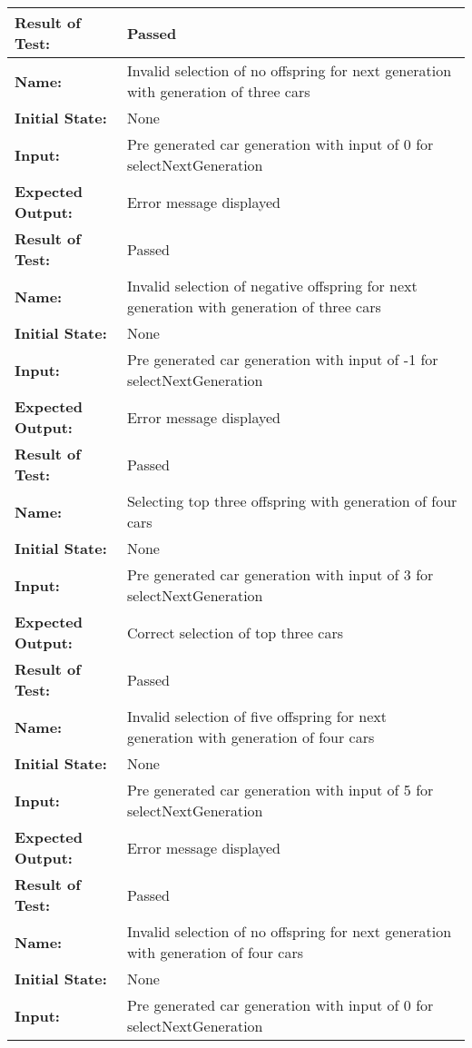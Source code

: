 \documentclass[12pt, titlepage]{article}
\begin{document}
\begin{center}
\begin{longtable}{ l | p{10cm} }
\textbf{Result of Test:} & Passed\\
\hline
\rule{0pt}{1.5em}\textbf{Name:} & Invalid selection of no offspring for next generation with generation of three cars\\
\textbf{Initial State:} & None\\
\textbf{Input:} & Pre generated car generation with input of 0 for selectNextGeneration\\
\textbf{Expected Output:} & Error message displayed\\[0.6em]
\textbf{Result of Test:} & Passed\\
\hline
\rule{0pt}{1.5em}\textbf{Name:} & Invalid selection of negative offspring for next generation with generation of three cars\\
\textbf{Initial State:} & None\\
\textbf{Input:} & Pre generated car generation with input of -1 for selectNextGeneration\\
\textbf{Expected Output:} & Error message displayed\\[0.6em]
\textbf{Result of Test:} & Passed\\
\hline
\rule{0pt}{1.5em}\textbf{Name:} & Selecting top three offspring with generation of four cars\\
\textbf{Initial State:} & None\\
\textbf{Input:} & Pre generated car generation with input of 3 for selectNextGeneration\\
\textbf{Expected Output:} & Correct selection of top three cars\\[0.6em]
\textbf{Result of Test:} & Passed\\
\hline
\rule{0pt}{1.5em}\textbf{Name:} & Invalid selection of five offspring for next generation with generation of four cars\\
\textbf{Initial State:} & None\\
\textbf{Input:} & Pre generated car generation with input of 5 for selectNextGeneration\\
\textbf{Expected Output:} & Error message displayed\\[0.6em]
\textbf{Result of Test:} & Passed\\
\hline
\rule{0pt}{1.5em}\textbf{Name:} & Invalid selection of no offspring for next generation with generation of four cars\\
\textbf{Initial State:} & None\\
\textbf{Input:} & Pre generated car generation with input of 0 for selectNextGeneration\\

\end{longtable}
\end{center}
\end{document}
